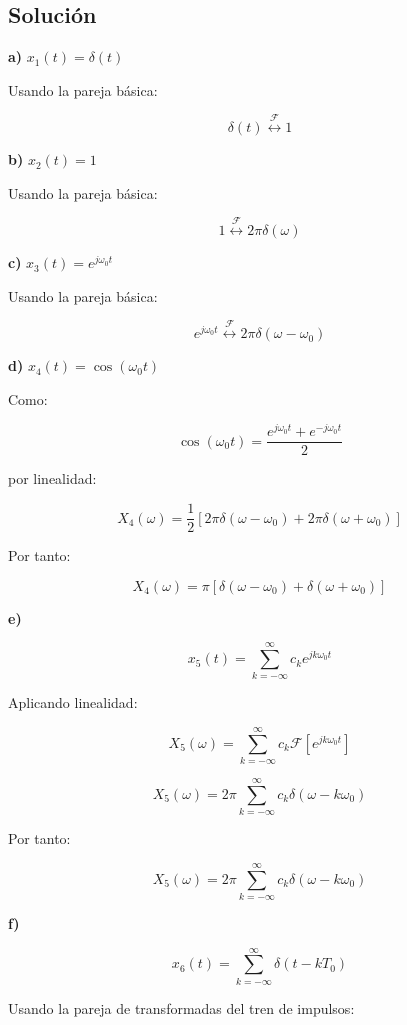 \documentclass[fleqn]{article}
\begin{document}
	\subsection{Solución}

	\textbf{a) } $x_1(t)=\delta(t)$

	Usando la pareja básica:

	\[
	\boxed{
	\delta(t)
	\overset{\mathcal{F}}{\longleftrightarrow}
	1
	}
	\]

	\textbf{b) } $x_2(t)=1$

	Usando la pareja básica:

	\[
	\boxed{
	1
	\overset{\mathcal{F}}{\longleftrightarrow}
	2\pi\delta(\omega)
	}
	\]

	\textbf{c) } $x_3(t)=e^{j\omega_0t}$

	Usando la pareja básica:

	\[
	\boxed{
	e^{j\omega_0t}
	\overset{\mathcal{F}}{\longleftrightarrow}
	2\pi\delta(\omega-\omega_0)
	}
	\]

	\textbf{d) } $x_4(t)=\cos(\omega_0t)$

	Como:

	\[
	\cos(\omega_0t)
	=
	\frac{
	e^{j\omega_0t}
	+
	e^{-j\omega_0t}
	}{2}
	\]

	por linealidad:

	\[
	X_4(\omega)
	=
	\frac{1}{2}
	\left[
	2\pi\delta(\omega-\omega_0)
	+
	2\pi\delta(\omega+\omega_0)
	\right]
	\]

	Por tanto:

	\[
	\boxed{
	X_4(\omega)
	=
	\pi
	\left[
	\delta(\omega-\omega_0)
	+
	\delta(\omega+\omega_0)
	\right]
	}
	\]

	\textbf{e) }

	\[
	x_5(t)
	=
	\sum_{k=-\infty}^{\infty}
	c_k e^{jk\omega_0t}
	\]

	Aplicando linealidad:

	\[
	X_5(\omega)
	=
	\sum_{k=-\infty}^{\infty}
	c_k
	\mathcal{F}
	\left[
	e^{jk\omega_0t}
	\right]
	\]

	\[
	X_5(\omega)
	=
	2\pi
	\sum_{k=-\infty}^{\infty}
	c_k
	\delta(\omega-k\omega_0)
	\]

	Por tanto:

	\[
	\boxed{
	X_5(\omega)
	=
	2\pi
	\sum_{k=-\infty}^{\infty}
	c_k
	\delta(\omega-k\omega_0)
	}
	\]

	\textbf{f) }

	\[
	x_6(t)
	=
	\sum_{k=-\infty}^{\infty}
	\delta(t-kT_0)
	\]

	Usando la pareja de transformadas del tren de impulsos:
\end{document}
